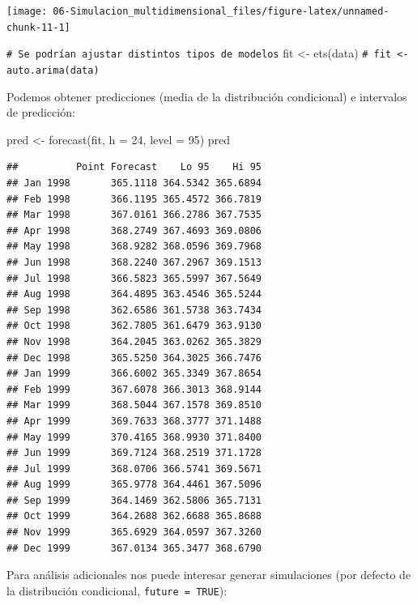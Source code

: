 \documentclass[
]{book}
\newenvironment{Shaded}{\begin{snugshade}}{\end{snugshade}}
\newcommand{\AttributeTok}[1]{\textcolor[rgb]{0.77,0.63,0.00}{#1}}
\newcommand{\CommentTok}[1]{\textcolor[rgb]{0.56,0.35,0.01}{\textit{#1}}}
\newcommand{\DecValTok}[1]{\textcolor[rgb]{0.00,0.00,0.81}{#1}}
\newcommand{\FunctionTok}[1]{\textcolor[rgb]{0.00,0.00,0.00}{#1}}
\newcommand{\NormalTok}[1]{#1}
\newcommand{\OtherTok}[1]{\textcolor[rgb]{0.56,0.35,0.01}{#1}}
\theoremstyle{break}
\theoremstyle{nonumberplain}
\renewcommand{\CommentTok}[1]{\textcolor[rgb]{0.41,0.41,0.41}{\texttt{#1}}}
\begin{document}
\begin{center}\texttt{[image: 06-Simulacion\_multidimensional\_files/figure-latex/unnamed-chunk-11-1]} \end{center}

\begin{Shaded}
\begin{Highlighting}[]
\CommentTok{\# Se podrían ajustar distintos tipos de modelos}
\NormalTok{fit }\OtherTok{\textless{}{-}} \FunctionTok{ets}\NormalTok{(data)}
\CommentTok{\# fit \textless{}{-} auto.arima(data)}
\end{Highlighting}
\end{Shaded}

Podemos obtener predicciones (media de la distribución condicional) e intervalos de predicción:

\begin{Shaded}
\begin{Highlighting}[]
\NormalTok{pred }\OtherTok{\textless{}{-}} \FunctionTok{forecast}\NormalTok{(fit, }\AttributeTok{h =} \DecValTok{24}\NormalTok{, }\AttributeTok{level =} \DecValTok{95}\NormalTok{)}
\NormalTok{pred}
\end{Highlighting}
\end{Shaded}

\begin{verbatim}
##          Point Forecast    Lo 95    Hi 95
## Jan 1998       365.1118 364.5342 365.6894
## Feb 1998       366.1195 365.4572 366.7819
## Mar 1998       367.0161 366.2786 367.7535
## Apr 1998       368.2749 367.4693 369.0806
## May 1998       368.9282 368.0596 369.7968
## Jun 1998       368.2240 367.2967 369.1513
## Jul 1998       366.5823 365.5997 367.5649
## Aug 1998       364.4895 363.4546 365.5244
## Sep 1998       362.6586 361.5738 363.7434
## Oct 1998       362.7805 361.6479 363.9130
## Nov 1998       364.2045 363.0262 365.3829
## Dec 1998       365.5250 364.3025 366.7476
## Jan 1999       366.6002 365.3349 367.8654
## Feb 1999       367.6078 366.3013 368.9144
## Mar 1999       368.5044 367.1578 369.8510
## Apr 1999       369.7633 368.3777 371.1488
## May 1999       370.4165 368.9930 371.8400
## Jun 1999       369.7124 368.2519 371.1728
## Jul 1999       368.0706 366.5741 369.5671
## Aug 1999       365.9778 364.4461 367.5096
## Sep 1999       364.1469 362.5806 365.7131
## Oct 1999       364.2688 362.6688 365.8688
## Nov 1999       365.6929 364.0597 367.3260
## Dec 1999       367.0134 365.3477 368.6790
\end{verbatim}

Para análisis adicionales nos puede interesar generar simulaciones (por defecto de la distribución condicional, \texttt{future\ =\ TRUE}):
\end{document}
